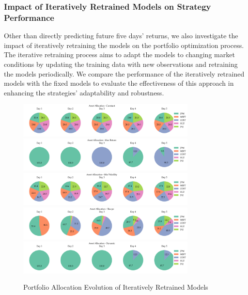 \subsubsection{Impact of Iteratively Retrained Models on Strategy Performance}
Other than directly predicting future five days' returns, we also investigate the impact of iteratively retraining the models on the portfolio optimization process. The iterative retraining process aims to adapt the models to changing market conditions by updating the training data with new observations and retraining the models periodically.
 We compare the performance of the iteratively retrained models with the fixed models to evaluate the effectiveness of this approach in enhancing the strategies' adaptability and robustness.
\begin{figure}[htbp]
    \centering
    \includegraphics[width=0.8\textwidth]{figures/iterative/asset_allocations_constant.png}
    \includegraphics[width=0.8\textwidth]{figures/iterative/asset_allocations_max_return.png}
    \includegraphics[width=0.8\textwidth]{figures/iterative/asset_allocations_min_volatility.png}
    \includegraphics[width=0.8\textwidth]{figures/iterative/asset_allocations_sharpe.png}
    \includegraphics[width=0.8\textwidth]{figures/iterative/asset_allocations_dynamic.png}
    \caption{Portfolio Allocation Evolution of Iteratively Retrained Models}
    \label{fig:asset_allocations_evolution_iterative}
\end{figure}
